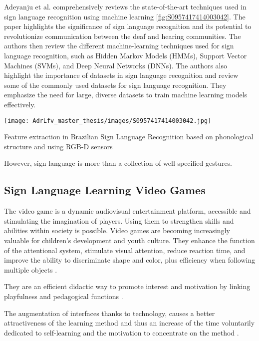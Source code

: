 Adeyanju et al. comprehensively reviews the state-of-the-art techniques used in sign language recognition using machine learning \cite{almeida2014feature} \ref{fig:S0957417414003042}. The paper highlights the significance of sign language recognition and its potential to revolutionize communication between the deaf and hearing communities. The authors then review the different machine-learning techniques used for sign language recognition, such as Hidden Markov Models (HMMs), Support Vector Machines (SVMs), and Deep Neural Networks (DNNs).
The authors also highlight the importance of datasets in sign language recognition and review some of the commonly used datasets for sign language recognition. They emphasize the need for large, diverse datasets to train machine learning models effectively.

\begin{marginfigure}
    \centering
    \texttt{[image: AdrLfv\_master\_thesis/images/S0957417414003042.jpg]}
    \caption{Feature extraction in Brazilian Sign Language Recognition based on phonological structure and using RGB-D sensors}
    \label{fig:S0957417414003042}
\end{marginfigure}

However, sign language is more than a collection of well-specified gestures.


\subsection{Sign Language Learning Video Games}

The video game is a dynamic audiovisual entertainment platform, accessible and stimulating the imagination of players. Using them to strengthen skills and abilities within society is possible. Video games are becoming increasingly valuable for children's development and youth culture.
They enhance the function of the attentional system, stimulate visual attention, reduce reaction time, and improve the ability to discriminate shape and color, plus efficiency when following multiple objects \cite{green2006enumeration}.

They are an efficient didactic way to promote interest and motivation by linking playfulness and pedagogical functions \cite{tejeiro2009efectos}.

The augmentation of interfaces thanks to technology, causes a better attractiveness of the learning method and thus an increase of the time voluntarily dedicated to self-learning and the motivation to concentrate on the method \cite{baker1994}.

